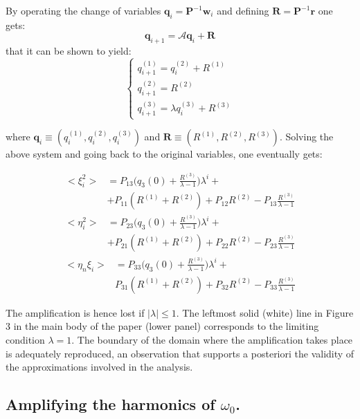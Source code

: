 \documentclass[showpacs,prl,superscriptaddress,nofootinbib, twocolumn]{revtex4}
\begin{document}
By operating the change of variables ${\boldsymbol {q}}_i={\boldsymbol {P}}^{-1}{\boldsymbol {w}}_i$ and defining 
${\boldsymbol {R}}={\boldsymbol {P}}^{-1}{\boldsymbol {r}}$ one gets: 
\[
{\boldsymbol q}_{i+1}={\boldsymbol {\mathcal A}} {\boldsymbol q}_i+{\boldsymbol R}
\]
that it can be shown to yield:
\[
\begin{cases}
q_{i+1}^{(1)}=q_{i}^{(2)}+R^{(1)} \\
q_{i+1}^{(2)}=R^{(2)} \\
q_{i+1}^{(3)}=\lambda q_{i}^{(3)}+R^{(3)}
\end{cases}
\]

where ${\boldsymbol q}_i \equiv (q_i^{(1)}, q_i^{(2)},q_i^{(3)})$  and ${\boldsymbol R} \equiv (R^{(1)}, R^{(2)},R^{(3)})$.
Solving the above system and going back to the original variables, one eventually gets:

\[
\begin{split}
<\xi^2_i>&=P_{13}\big(q_3(0)+\frac{R^{(3)}}{\lambda-1}\big)\lambda^i+\\
&+P_{11}(R^{(1)}+R^{(2)})+P_{12}R^{(2)}-P_{13}\frac{R^{(3)}}{\lambda-1}
\end{split}
\]
\[
\begin{split}
<\eta^2_i>&=P_{23}\big(q_3(0)+\frac{R^{(3)}}{\lambda-1}\big)\lambda^i+\\
&+P_{21}(R^{(1)}+R^{(2)})+P_{22}R^{(2)}-P_{23}\frac{R^{(3)}}{\lambda-1}
\end{split}
\]
\[
\begin{split}
<\eta_n\xi_i>&=P_{33}\big(q_3(0)+\frac{R^{(3)}}{\lambda-1}\big)\lambda^i+\\
&P_{31}(R^{(1)}+R^{(2)})+P_{32}R^{(2)}-P_{33}\frac{R^{(3)}}{\lambda-1}
\end{split}
\]

The amplification is hence lost if $|\lambda| \le 1$. The leftmost solid (white) line in Figure 3 in the main body of the paper (lower panel) corresponds to the limiting condition $\lambda=1$. The boundary of the domain where the amplification takes place is adequately reproduced, an observation that supports a posteriori the validity of the approximations involved in the analysis. 



\subsection{Amplifying the harmonics of $\omega_0$.}
\end{document}
